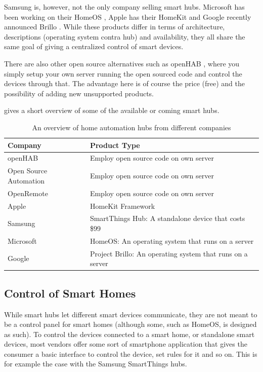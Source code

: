 Samsung is, however, not the only company selling smart hubs. 
Microsoft has been working on their HomeOS \cite{HOMEOS}, Apple has their HomeKit \cite{HOMEKIT} and Google recently announced Brillo \cite{BRILLO}. 
While these products differ in terms of architecture, descriptions (operating system contra hub) and availability,
they all share the same goal of giving a centralized control of smart devices. 

There are also other open source alternatives such as openHAB \cite{OPENHAB}, 
where you simply setup your own server running the open sourced code and control the devices through that. 
The advantage here is of course the price (free) and the possibility of adding new unsupported products. 

 gives a short overview of some of the available or coming smart hubs. 
\begin{table}
    \centering
    \begin{tabular}{l l}
        Company                           & Product Type \\ \hline
        openHAB \cite{OPENHAB}             & Employ open source code on own server \\
        Open Source Automation \cite{OSA}  & Employ open source code on own server \\
        OpenRemote \cite{OPENREMOTE}       & Employ open source code on own server \\
        Apple \cite{HOMEKIT}               & HomeKit Framework \\
        Samsung \cite{SMARTTHINGS}         & SmartThings Hub: A standalone device that costs \$99 \\
        Microsoft \cite{HOMEOS}            & HomeOS: An operating system that runs on a server \\
        Google \cite{BRILLO}               & Project Brillo: An operating system that runs on a server
    \end{tabular}
    \caption{An overview of home automation hubs from different companies}
    \label{table:smarthubs}
\end{table}

\subsection{Control of Smart Homes}\label{sec:smarthomecontrol}
While smart hubs let different smart devices communicate, 
they are not meant to be a control panel for smart homes (although some, such as HomeOS, is designed as such).
To control the devices connected to a smart home, or standalone smart devices, 
most vendors offer some sort of smartphone application that gives the consumer a basic interface to control the device, set rules for it and so on.
This is for example the case with the Samsung SmartThings hubs. 

